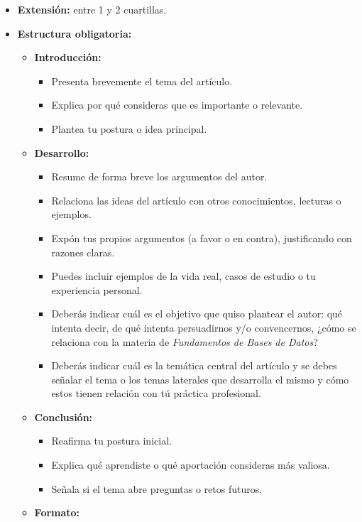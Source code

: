 \documentclass[12pt]{report}
\begin{document}
\begin{enumerate}[label=\textbf{\arabic*.}, leftmargin=*]
\begin{enumerate}[label=\textbf{\alph*.}, leftmargin=*, itemsep=1.0em]
\begin{itemize}
  \item \textbf{Extensi\'on:} entre 1 y 2 cuartillas.
  \item \textbf{Estructura obligatoria:}
  \begin{itemize}
    \item \textbf{Introducci\'on:}
    \begin{itemize}
      \item Presenta brevemente el tema del art\'iculo.
      \item Explica por qu\'e consideras que es importante o relevante.
      \item Plantea tu postura o idea principal.
    \end{itemize}
    \item \textbf{Desarrollo:}
    \begin{itemize}
      \item Resume de forma breve los argumentos del autor.
      \item Relaciona las ideas del art\'iculo con otros conocimientos, lecturas o ejemplos.
      \item Exp\'on tus propios argumentos (a favor o en contra), justificando con razones claras.
      \item Puedes incluir ejemplos de la vida real, casos de estudio o tu experiencia personal.
      \item Deber\'as indicar cu\'al es el objetivo que quiso plantear el autor: qu\'e intenta decir, de qu\'e intenta persuadirnos y/o convencernos, ¿c\'omo se relaciona con la materia de \textit{Fundamentos de Bases de Datos}?
      \item Deber\'as indicar cu\'al es la tem\'atica central del art\'iculo y se debes se\~nalar el tema o los temas laterales que desarrolla el mismo y c\'omo estos tienen relaci\'on con t\'u pr\'actica profesional.
    \end{itemize}
    \item \textbf{Conclusi\'on:}
    \begin{itemize}
      \item Reafirma tu postura inicial.
      \item Explica qu\'e aprendiste o qu\'e aportaci\'on consideras m\'as valiosa.
      \item Se\~nala si el tema abre preguntas o retos futuros.
    \end{itemize}
    \item \textbf{Formato:}
    \begin{itemize}

\end{itemize}
\end{itemize}
\end{itemize}
\end{enumerate}
\end{enumerate}
\end{document}
